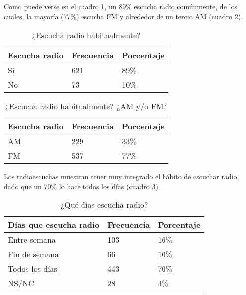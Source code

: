 \indent Como puede verse en el cuadro \ref{EscuchaRadioTabla1}, un 89$\%$ escucha radio comúnmente, de los cuales, la mayoría (77$\%$) escucha FM y alrededor de un tercio AM (cuadro \ref{EscuchaRadioTabla2}).\\

\begin{table}[ht]
	\centering
{}
		\begin{tabular}{|l|l|l|}\hline
	\textbf{Escucha radio}&\textbf{Frecuencia}&\textbf{Porcentaje}\\\hline\hline
			Sí	&	621&	89$\%$\\\hline
			No	&	73&	10$\%$\\\hline
		\end{tabular}
	  \caption{¿Escucha radio habitualmente?}
	  \label{EscuchaRadioTabla1}
\end{table}

\begin{table}[ht]
	\centering
{}
		\begin{tabular}{|l|l|l|}\hline
	\textbf{Escucha radio}&\textbf{Frecuencia}&\textbf{Porcentaje}\\\hline\hline
			AM	&	229&	33$\%$\\\hline
			FM	&	537&	77$\%$\\\hline
		\end{tabular}
	  \caption{¿Escucha radio habitualmente? ¿AM y/o FM?}
	  \label{EscuchaRadioTabla2}
\end{table}

\indent Los radioescuchas muestran tener muy integrado el hábito de escuchar radio, dado que un 70$\%$ lo hace todos los días (cuadro \ref{DiasRadioTabla}).

\begin{table}[htpb]
	\centering
{}
		\begin{tabular}{|l|l|l|}\hline
	\textbf{Días que escucha radio}&\textbf{Frecuencia}&\textbf{Porcentaje}\\\hline\hline
			Entre semana	&	103&	16$\%$\\\hline
			Fin de semana	&	66&	10$\%$\\\hline
			Todos los días	&	443&	70$\%$\\\hline
			NS/NC	&	28&	4$\%$\\\hline
		\end{tabular}
	  \caption{¿Qué días escucha radio?}
	  \label{DiasRadioTabla}
\end{table}


